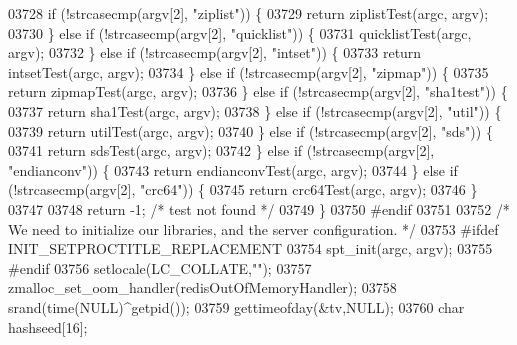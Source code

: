 \begin{DoxyCode}
{{{{{{{{{{{{{{{{{{{{{{{{{{{{{{{{{{{{{{{{{{{{{{{{{{{{{{{{{{{{{{{{{{{{{{{{{{{{{{{{{{{{{{{{{{{{{{{{{{{{{{{{{{{{{{{{{{{{{{{{{{{{{{{{{{{{{{{{{{{{{{{{{{{{{{{{{{{{{{{{{{{{{{{{{{{{{{{{{{03728         \textcolor{keywordflow}{if} (!strcasecmp(argv[2], \textcolor{stringliteral}{"ziplist"})) \{
03729             \textcolor{keywordflow}{return} ziplistTest(argc, argv);
03730         \} \textcolor{keywordflow}{else} \textcolor{keywordflow}{if} (!strcasecmp(argv[2], \textcolor{stringliteral}{"quicklist"})) \{
03731             quicklistTest(argc, argv);
03732         \} \textcolor{keywordflow}{else} \textcolor{keywordflow}{if} (!strcasecmp(argv[2], \textcolor{stringliteral}{"intset"})) \{
03733             \textcolor{keywordflow}{return} intsetTest(argc, argv);
03734         \} \textcolor{keywordflow}{else} \textcolor{keywordflow}{if} (!strcasecmp(argv[2], \textcolor{stringliteral}{"zipmap"})) \{
03735             \textcolor{keywordflow}{return} zipmapTest(argc, argv);
03736         \} \textcolor{keywordflow}{else} \textcolor{keywordflow}{if} (!strcasecmp(argv[2], \textcolor{stringliteral}{"sha1test"})) \{
03737             \textcolor{keywordflow}{return} sha1Test(argc, argv);
03738         \} \textcolor{keywordflow}{else} \textcolor{keywordflow}{if} (!strcasecmp(argv[2], \textcolor{stringliteral}{"util"})) \{
03739             \textcolor{keywordflow}{return} utilTest(argc, argv);
03740         \} \textcolor{keywordflow}{else} \textcolor{keywordflow}{if} (!strcasecmp(argv[2], \textcolor{stringliteral}{"sds"})) \{
03741             \textcolor{keywordflow}{return} sdsTest(argc, argv);
03742         \} \textcolor{keywordflow}{else} \textcolor{keywordflow}{if} (!strcasecmp(argv[2], \textcolor{stringliteral}{"endianconv"})) \{
03743             \textcolor{keywordflow}{return} endianconvTest(argc, argv);
03744         \} \textcolor{keywordflow}{else} \textcolor{keywordflow}{if} (!strcasecmp(argv[2], \textcolor{stringliteral}{"crc64"})) \{
03745             \textcolor{keywordflow}{return} crc64Test(argc, argv);
03746         \}
03747 
03748         \textcolor{keywordflow}{return} -1; \textcolor{comment}{/* test not found */}
03749     \}
03750 \textcolor{preprocessor}{#}\textcolor{preprocessor}{endif}
03751 
03752     \textcolor{comment}{/* We need to initialize our libraries, and the server configuration. */}
03753 \textcolor{preprocessor}{#}\textcolor{preprocessor}{ifdef} INIT\_SETPROCTITLE\_REPLACEMENT
03754     spt\_init(argc, argv);
03755 \textcolor{preprocessor}{#}\textcolor{preprocessor}{endif}
03756     setlocale(LC\_COLLATE,\textcolor{stringliteral}{""});
03757     zmalloc\_set\_oom\_handler(redisOutOfMemoryHandler);
03758     srand(time(NULL)^getpid());
03759     gettimeofday(&tv,NULL);
03760     \textcolor{keywordtype}{char} hashseed[16];
}}}}}}}}}}}}}}}}}}}}}}}}}}}}}}}}}}}}}}}}}}}}}}}}}}}}}}}}}}}}}}}}}}}}}}}}}}}}}}}}}}}}}}}}}}}}}}}}}}}}}}}}}}}}}}}}}}}}}}}}}}}}}}}}}}}}}}}}}}}}}}}}}}}}}}}}}}}}}}}}}}}}}}}}}}}}}}}}}}
\end{DoxyCode}
